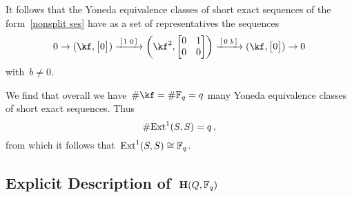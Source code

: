 \documentclass[a4paper, 11pt, twoside=semi]{scrartcl}
\begin{document}
It follows that the Yoneda equivalence classes of short exact sequences of the form~\eqref{nonsplit ses} have as a set of representatives the sequences
\[ 
  0
  \to
  (\kf, \begin{bmatrix} 0 \end{bmatrix})
  \xlongto{ \begin{bsmallmatrix} 1 & 0 \end{bsmallmatrix} }
  \biggl( \kf^2, \begin{bmatrix} 0 & 1 \\ 0 & 0 \end{bmatrix} \biggr)
  \xlongto{ \begin{bsmallmatrix} 0 & b \end{bsmallmatrix} }
  (\kf, \begin{bmatrix} 0 \end{bmatrix})
  \to
  0
\]
with~$b \neq 0$.

We find that overall we have~$\counting \kf = \counting \Finite_q = q$ many Yoneda equivalence classes of short exact sequences.
Thus
\[
  \# {\operatorname{Ext}^1(S,S)}
  =
  q \,,
\]
from which it follows that~$\operatorname{Ext}^1(S,S) \cong \mathbb{F}_q$.



\subsection{Explicit Description of~$\mathbf{H}(Q, \mathbb{F}_q)$}
\label{explicit description of hall algebra over Fq}
\end{document}
